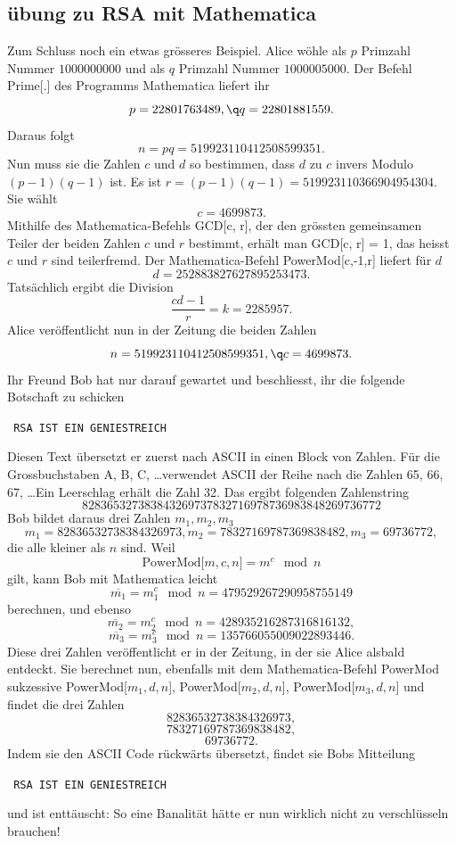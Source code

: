 \documentclass[%
<<<<<<< Updated upstream
11pt,%
twoside,%
titlepage,%
german,%
headsepline%
]{scrartcl}
\begin{document}
\begin{cdef}[Linksverschiebung]{}
\begin{cdef}{}
\subsection{übung zu RSA mit Mathematica}
Zum
Schluss noch ein etwas grösseres Beispiel. Alice wöhle als $p$ Primzahl Nummer $1000000000$ und als $q$ Primzahl Nummer $1000005000$. Der Befehl Prime[.] des Programms Mathematica liefert ihr
$$p = 22801763489,\q	q = 22801881559.$$
Daraus folgt
$$n = pq = 519923110412508599351.$$
Nun muss sie die Zahlen $c$ und $d$ so bestimmen, dass $d$ zu $c$ invers Modulo $(p-1)(q-1)$ ist. Es ist
$r = (p-1)(q-1) = 519923110366904954304$. Sie wählt
$$c = 4699873.$$
Mithilfe des Mathematica-Befehls GCD[c, r], der den gr\"ossten gemeinsamen Teiler der beiden Zahlen $c$ und $r$ bestimmt, erhält man GCD[c, r] = 1, das heisst $c$ und $r$ sind teilerfremd. Der Mathematica-Befehl PowerMod[c,-1,r] liefert für $d$
$$d = 252883827627895253473.$$
Tatsächlich ergibt die Division
$$\frac{cd - 1}{r} = k = 2285957.$$
Alice ver\"offentlicht nun in der Zeitung die beiden Zahlen
$$n = 519923110412508599351,\q	c = 4699873.$$
Ihr Freund Bob hat nur darauf gewartet und beschliesst, ihr die folgende Botschaft zu schicken
\begin{center}
\texttt{
RSA IST EIN GENIESTREICH
}
\end{center}
Diesen Text übersetzt er zuerst nach ASCII in einen Block von Zahlen. Für die Grossbuchstaben A, B, C, \dots verwendet ASCII der Reihe nach die Zahlen 65, 66, 67, \dots Ein Leerschlag erhält die Zahl 32. Das ergibt folgenden Zahlenstring
$$82 83 65 32 73 83 84 32 69 73 78 32 71 69 78 73 69 83 84 82 69 73 67 72$$
Bob bildet daraus drei Zahlen $m_1, m_2, m_3$
$$m_1 = 82836532738384326973, m_2 = 78327169787369838482, m_3 = 69736772,$$
die alle kleiner als $n$ sind. Weil
$$\text{PowerMod[$m,c,n$]} = m^c\mod n$$
gilt, kann Bob mit Mathematica leicht
$$\overline{m_1} = m_1^c\mod n = 479529267290958755149$$
berechnen, und ebenso
$$\overline{m_2} = m_2^c\mod n = 428935216287316816132,$$
$$\overline{m_3} = m_3^c\mod n = 135766055009022893446.$$
Diese drei Zahlen ver\"offentlicht er in der Zeitung, in der sie Alice alsbald entdeckt. Sie berechnet nun, ebenfalls mit dem Mathematica-Befehl PowerMod sukzessive PowerMod[$m_1,d,n$], 
PowerMod[$m_2,d,n$], PowerMod[$m_3,d,n$] und findet die drei Zahlen
$$82836532738384326973,$$
$$78327169787369838482,$$
$$69736772.$$
Indem sie den ASCII Code rückwärts übersetzt, findet sie Bobs Mitteilung
\begin{center}
\texttt{
RSA IST EIN GENIESTREICH
}
\end{center}
und ist enttäuscht: So eine Banalität hätte er nun wirklich nicht zu verschlüsseln brauchen!


\end{cdef}
\end{cdef}
\end{document}
